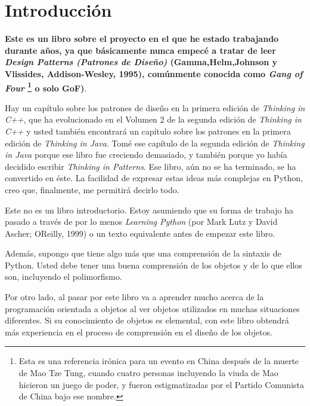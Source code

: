 \section*{Introducción}
\label{sec:intro}

\textbf{Este es un libro sobre el proyecto en el que he estado trabajando durante años, ya que básicamente nunca empecé a tratar de leer \textit{Design Patterns (Patrones de Diseño) }  (Gamma,Helm,Johnson y Vlissides, Addison-Wesley, 1995), comúnmente conocida como \textit{Gang of Four} \footnote{Esta es una referencia irónica para un evento en China después de la muerte de Mao Tze Tung, cuando cuatro personas incluyendo la viuda de Mao hicieron un juego de poder, y fueron estigmatizadas por el Partido Comunista de China bajo ese nombre.} o solo GoF)}.  \newline

Hay un capítulo sobre los patrones de diseño en la primera edición de \textit{Thinking in C++}, que ha evolucionado en el Volumen 2 de la segunda edición de \textit{Thinking in C++} y usted también encontrará un capítulo sobre los patrones en la primera edición de \textit{Thinking in Java}. Tomé ese capítulo de la segunda edición de \textit{Thinking in Java} porque ese libro fue creciendo demasiado, y también porque yo había decidido escribir \textit{Thinking in Patterns}. Ese libro,  aún no se ha terminado, se ha convertido en éste. La facilidad de expresar estas ideas más complejas en Python, creo que, finalmente, me permitirá decirlo todo. \newline

Este no es un libro introductorio. Estoy asumiendo que su forma de trabajo ha pasado a través de por lo menos \textit{Learning Python} (por Mark Lutz y David Ascher; OReilly, 1999) o un texto equivalente antes de empezar este libro. \newline

Además, supongo que tiene algo más que una comprensión de la sintaxis de Python. Usted debe tener una buena comprensión de los objetos y de lo que ellos son, incluyendo el polimorfismo. \newline

Por otro lado, al pasar por este libro va a aprender mucho acerca de la programación orientada a objetos al ver objetos utilizados en muchas situaciones diferentes. Si su conocimiento de objetos es elemental, con este libro obtendrá más experiencia en el proceso de comprensión en el diseño de los objetos.

